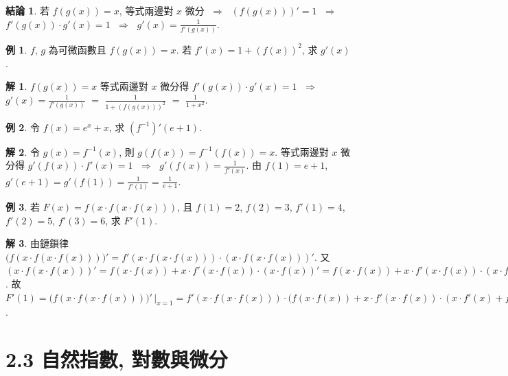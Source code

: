 \documentclass[12pt]{extarticle}
\newcommand{\ds}{\displaystyle}
\newcommand{\ie}{\;\Longrightarrow\;}
\theoremstyle{definition}
\newtheorem*{fact}{結論}
\newtheorem*{ex}{例}
\newtheorem*{sol}{解}
\begin{document}
\begin{fact}
  若 $f(g(x)) = x$, 等式兩邊對 $x$ 微分 $\ie$ $\ds(f(g(x)))' = 1$ $\ie$ $\ds f'(g(x))\cdot g'(x) = 1$ $\ie$ $\ds g'(x) = \frac{1}{f'(g(x))}$.   
\end{fact}

\begin{ex}
  $f$, $g$ 為可微函數且 $\ds f(g(x)) = x$. 若 $\ds f'(x) = 1 + (f(x))^2$, 求 $g'(x)$.   
\end{ex}

\begin{sol}
  $\ds f(g(x)) = x$ 等式兩邊對 $x$ 微分得 $\ds f'(g(x))\cdot g'(x) = 1$ $\ie$ $\ds g'(x) = \frac{1}{f'(g(x))}$ $=$ $\ds\frac{1}{1 + (f(g(x)))^2}$ $=$ $\ds\frac{1}{1 + x^2}$. 
\end{sol}

\begin{ex}
  令 $\ds f(x) = e^x + x$, 求 $\ds (f^{-1})'(e + 1)$. 
\end{ex}

\begin{sol}
  令 $\ds g(x) = f^{-1}(x)$, 則 $\ds g(f(x)) = f^{-1}(f(x)) = x$. 等式兩邊對 $x$ 微分得 $\ds g'(f(x))\cdot f'(x) = 1$ $\ie$ $\ds g'(f(x)) = \frac{1}{f'(x)}$. 由 $f(1) = e + 1$, $\ds g'(e + 1) = g'(f(1)) = \frac{1}{f'(1)} = \frac{1}{e + 1}$. 
\end{sol}

\begin{ex}
  若 $F(x) = f(x\cdot f(x\cdot f(x)))$, 且 $f(1) = 2$, $f(2) = 3$, $f'(1) = 4$, $f'(2) = 5$, $f'(3) = 6$, 求 $F'(1)$. 
\end{ex}

\begin{sol}
  由鏈鎖律 $\ds\big(f(x\cdot f(x\cdot f(x)))\big)' = f'(x\cdot f(x\cdot f(x)))\cdot(x\cdot f(x\cdot f(x)))'$. 又 $\ds(x\cdot f(x\cdot f(x)))' = f(x\cdot f(x)) + x\cdot f'(x\cdot f(x))\cdot(x\cdot f(x))' =  f(x\cdot f(x)) + x\cdot f'(x\cdot f(x))\cdot(x\cdot f'(x) + f(x))$. 故 $\ds F'(1) = \big(f(x\cdot f(x\cdot f(x)))\big)'\,\big|_{x = 1} = f'(x\cdot f(x\cdot f(x)))\cdot\big(f(x\cdot f(x)) + x\cdot f'(x\cdot f(x))\cdot(x\cdot f'(x) + f(x))\big)\,\big|_{x = 1} = f'(f(f(1)))\cdot\big(f(f(1)) + f'(f(1))\cdot(f'(1) + f(1))\big) = 6\cdot\big(3 + 5\cdot(4 + 2)\big) = 198$. 
\end{sol}

\section*{2.3 自然指數, 對數與微分}
\end{document}
